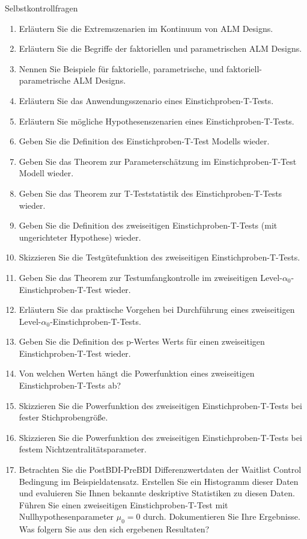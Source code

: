 \documentclass[
  8pt,
  ignorenonframetext,
]{beamer}
\begin{document}
\begin{frame}{Selbstkontrollfragen}
\protect\hypertarget{selbstkontrollfragen}{}
\footnotesize
{}
\begin{enumerate}
\justifying
\itemsep0mm
\item Erläutern Sie die Extremszenarien im Kontinuum von ALM Designs.
\item Erläutern Sie die Begriffe der faktoriellen und parametrischen ALM Designs.
\item Nennen Sie Beispiele für faktorielle, parametrische, und faktoriell-parametrische ALM Designs.
\item Erläutern Sie das Anwendungsszenario eines Einstichproben-T-Tests.
\item Erläutern Sie mögliche Hypothesenszenarien eines Einstichproben-T-Tests.
\item Geben Sie die Definition des Einstichproben-T-Test Modells wieder.
\item Geben Sie das Theorem zur Parameterschätzung im Einstichproben-T-Test Modell wieder.
\item Geben Sie das Theorem zur T-Teststatistik des Einstichproben-T-Tests wieder.
\item Geben Sie die Definition des zweiseitigen Einstichproben-T-Tests (mit ungerichteter Hypothese) wieder.
\item Skizzieren Sie die Testgütefunktion des zweiseitigen Einstichproben-T-Tests.
\item Geben Sie das Theorem zur Testumfangkontrolle im zweiseitigen Level-$\alpha_0$-Einstichproben-T-Test wieder.
\item Erläutern Sie das praktische Vorgehen bei Durchführung eines zweiseitigen Level-$\alpha_0$-Einstichproben-T-Tests.
\item Geben Sie die Definition des p-Wertes Werts für einen zweiseitigen Einstichproben-T-Test wieder.
\item Von welchen Werten hängt die Powerfunktion eines zweiseitigen Einstichproben-T-Tests ab?
\item Skizzieren Sie die Powerfunktion des zweiseitigen Einstichproben-T-Tests bei fester Stichprobengröße.
\item Skizzieren Sie die Powerfunktion des zweiseitigen Einstichproben-T-Tests bei festem Nichtzentralitätsparameter.
\item Betrachten Sie die PostBDI-PreBDI Differenzwertdaten der Waitlist Control Bedingung im Beispieldatensatz. Erstellen
Sie ein Histogramm dieser Daten und evaluieren Sie Ihnen bekannte deskriptive Statistiken zu diesen Daten. Führen Sie
einen zweiseitigen Einstichproben-T-Test mit Nullhypothesenparameter $\mu_0 = 0$ durch. Dokumentieren Sie Ihre Ergebnisse.
Was folgern Sie aus den sich ergebenen Resultaten?
\end{enumerate}
\end{frame}
\end{document}
